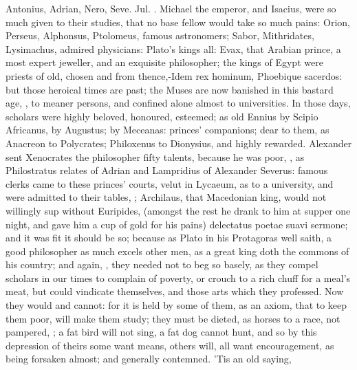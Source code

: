 {{Antonius, Adrian, Nero, Seve. Jul. \etc{}. Michael the emperor,
and Isacius, were so much given to their studies, that no base fellow
would take so much pains: Orion, Perseus, Alphonsus, Ptolomeus, famous
astronomers; Sabor, Mithridates, Lysimachus, admired physicians:
Plato's kings all: Evax, that Arabian prince, a most expert jeweller,
and an exquisite philosopher; the kings of Egypt were priests of old,
chosen and from thence,-Idem rex hominum, Phoebique sacerdos: but those
heroical times are past; the Muses are now banished in this bastard
age, , to meaner persons, and confined alone almost
to universities. In those days, scholars were highly beloved,
honoured, esteemed; as old Ennius by Scipio Africanus, \Virgil{} by
Augustus; \Horace{} by Meceanas: princes' companions; dear to them, as
Anacreon to Polycrates; Philoxenus to Dionysius, and highly rewarded.
Alexander sent Xenocrates the philosopher fifty talents, because he was
poor, , as Philostratus relates of Adrian and Lampridius of Alexander
Severus: famous clerks came to these princes' courts, velut in Lycaeum,
as to a university, and were admitted to their tables, ; Archilaus, that Macedonian king, would not
willingly sup without Euripides, (amongst the rest he drank to him at
supper one night, and gave him a cup of gold for his pains) delectatus
poetae suavi sermone; and it was fit it should be so; because as
Plato in his Protagoras well saith, a good philosopher as much
excels other men, as a great king doth the commons of his country; and
again, , they
needed not to beg so basely, as they compel scholars in our times
to complain of poverty, or crouch to a rich chuff for a meal's meat,
but could vindicate themselves, and those arts which they professed.
Now they would and cannot: for it is held by some of them, as an axiom,
that to keep them poor, will make them study; they must be dieted, as
horses to a race, not pampered, ; a fat bird will not sing, a
fat dog cannot hunt, and so by this depression of theirs some
want means, others will, all want encouragement, as being
forsaken almost; and generally contemned. 'Tis an old saying, }}
